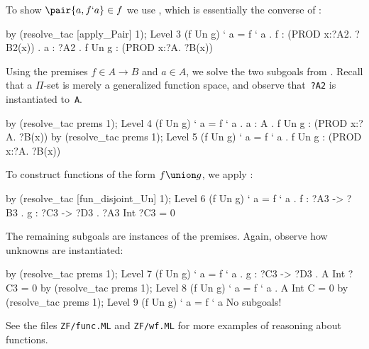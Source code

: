 To show $\pair{a,f`a}\in f$ we use , which is
essentially the converse of :
\begin{ttbox}
by (resolve_tac [apply_Pair] 1);
{\out Level 3}
{\out (f Un g) ` a = f ` a}
{. f : (PROD x:?A2. ?B2(x))}
{. a : ?A2}
{. f Un g : (PROD x:?A. ?B(x))}
\end{ttbox}
Using the premises $f\in A\to B$ and $a\in A$, we solve the two subgoals
from .  Recall that a $\Pi$-set is merely a generalized
function space, and observe that~{\tt?A2} is instantiated to~{\tt A}.
\begin{ttbox}
by (resolve_tac prems 1);
{\out Level 4}
{\out (f Un g) ` a = f ` a}
{. a : A}
{. f Un g : (PROD x:?A. ?B(x))}
by (resolve_tac prems 1);
{\out Level 5}
{\out (f Un g) ` a = f ` a}
{. f Un g : (PROD x:?A. ?B(x))}
\end{ttbox}
To construct functions of the form $f\union g$, we apply
:
\begin{ttbox}
by (resolve_tac [fun_disjoint_Un] 1);
{\out Level 6}
{\out (f Un g) ` a = f ` a}
{. f : ?A3 -> ?B3}
{. g : ?C3 -> ?D3}
{. ?A3 Int ?C3 = 0}
\end{ttbox}
The remaining subgoals are instances of the premises.  Again, observe how
unknowns are instantiated:
\begin{ttbox}
by (resolve_tac prems 1);
{\out Level 7}
{\out (f Un g) ` a = f ` a}
{. g : ?C3 -> ?D3}
{. A Int ?C3 = 0}
by (resolve_tac prems 1);
{\out Level 8}
{\out (f Un g) ` a = f ` a}
{. A Int C = 0}
by (resolve_tac prems 1);
{\out Level 9}
{\out (f Un g) ` a = f ` a}
{\out No subgoals!}
\end{ttbox}
See the files {\tt ZF/func.ML} and {\tt ZF/wf.ML} for more
examples of reasoning about functions.
